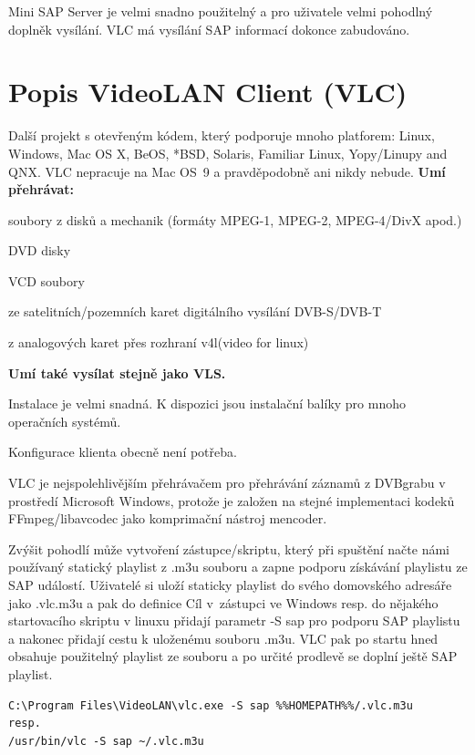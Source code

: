Mini SAP Server je velmi snadno použitelný a pro uživatele velmi pohodlný doplněk vysílání. VLC má vysílání SAP informací dokonce zabudováno.

\section{Popis VideoLAN Client (VLC)}

Další projekt s otevřeným kódem, který podporuje mnoho platforem: Linux, Windows, Mac OS X, BeOS, *BSD, Solaris, Familiar Linux, Yopy/Linupy and QNX. VLC nepracuje na Mac OS\ 9 a pravděpodobně ani nikdy nebude.
\vfill
\pagebreak
\textbf{Umí přehrávat:}
\bitem
\item soubory z disků a mechanik (formáty MPEG-1, MPEG-2, MPEG-4/DivX apod.)
\item DVD disky
\item VCD soubory
\item ze satelitních/pozemních karet digitálního vysílání DVB-S/DVB-T
\item z analogových karet přes rozhraní v4l(video for linux)
\eitem

\textbf{Umí také vysílat stejně jako VLS.}

Instalace je velmi snadná. K dispozici jsou instalační balíky pro mnoho operačních systémů.

Konfigurace klienta obecně není potřeba. 

VLC je nejspolehlivějším přehrávačem pro přehrávání záznamů z DVBgrabu v prostředí Microsoft Windows, protože je založen na stejné implementaci kodeků FFmpeg/libavcodec jako komprimační nástroj mencoder.

Zvýšit pohodlí může vytvoření zástupce/skriptu, který při spuštění načte námi používaný statický playlist z .m3u souboru a zapne podporu získávání playlistu ze SAP událostí. Uživatelé si uloží staticky playlist do svého domovského adresáře jako .vlc.m3u a pak do definice Cíl v~zástupci ve Windows resp. do nějakého startovacího skriptu v linuxu přidají parametr -S sap pro podporu SAP playlistu a nakonec přidají cestu k uloženému souboru .m3u. VLC pak po startu hned obsahuje použitelný playlist ze souboru a po určité prodlevě se doplní ještě SAP playlist.

\begin{small}
\begin{verbatim}
C:\Program Files\VideoLAN\vlc.exe -S sap %%HOMEPATH%%/.vlc.m3u
resp.
/usr/bin/vlc -S sap ~/.vlc.m3u
\end{verbatim}
\end{small}

